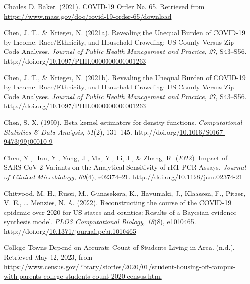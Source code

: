 \documentclass[12pt,twoside]{smiththesis}
\newlength{\cslhangindent}
\newenvironment{CSLReferences}[2] %
 {%
\setlength{\parindent}{0pt}
\ifodd #1 \everypar{\setlength{\hangindent}{\cslhangindent}}\ignorespaces\fi
\ifnum #2 > 0
\setlength{\parskip}{#2\baselineskip}
  \fi
}%
{}
\begin{document}
\begin{CSLReferences}{1}{0}
\leavevmode{}%
Charles D. Baker. (2021). {COVID-19 Order No}. 65. Retrieved from \url{https://www.mass.gov/doc/covid-19-order-65/download}

\leavevmode{}%
Chen, J. T., \& Krieger, N. (2021a). Revealing the {Unequal Burden} of {COVID-19} by {Income}, {Race}/{Ethnicity}, and {Household Crowding}: {US County Versus Zip Code Analyses}. \emph{Journal of Public Health Management and Practice}, \emph{27}, S43--S56. http://doi.org/\href{https://doi.org/10.1097/PHH.0000000000001263}{10.1097/PHH.0000000000001263}

\leavevmode{}%
Chen, J. T., \& Krieger, N. (2021b). Revealing the {Unequal Burden} of {COVID-19} by {Income}, {Race}/{Ethnicity}, and {Household Crowding}: {US County Versus Zip Code Analyses}. \emph{Journal of Public Health Management and Practice}, \emph{27}, S43--S56. http://doi.org/\href{https://doi.org/10.1097/PHH.0000000000001263}{10.1097/PHH.0000000000001263}

\leavevmode{}%
Chen, S. X. (1999). Beta kernel estimators for density functions. \emph{Computational Statistics \& Data Analysis}, \emph{31}(2), 131--145. http://doi.org/\href{https://doi.org/10.1016/S0167-9473(99)00010-9}{10.1016/S0167-9473(99)00010-9}

\leavevmode{}%
Chen, Y., Han, Y., Yang, J., Ma, Y., Li, J., \& Zhang, R. (2022). Impact of {SARS-CoV-2 Variants} on the {Analytical Sensitivity} of {rRT-PCR Assays}. \emph{Journal of Clinical Microbiology}, \emph{60}(4), e02374--21. http://doi.org/\href{https://doi.org/10.1128/jcm.02374-21}{10.1128/jcm.02374-21}

\leavevmode{}%
Chitwood, M. H., Russi, M., Gunasekera, K., Havumaki, J., Klaassen, F., Pitzer, V. E., \ldots{} Menzies, N. A. (2022). Reconstructing the course of the {COVID-19} epidemic over 2020 for {US} states and counties: {Results} of a {Bayesian} evidence synthesis model. \emph{PLOS Computational Biology}, \emph{18}(8), e1010465. http://doi.org/\href{https://doi.org/10.1371/journal.pcbi.1010465}{10.1371/journal.pcbi.1010465}

\leavevmode{}%
College {Towns Depend} on {Accurate Count} of {Students Living} in {Area}. (n.d.). Retrieved May 12, 2023, from \url{https://www.census.gov/library/stories/2020/01/student-housing-off-campus-with-parents-college-students-count-2020-census.html}


\end{CSLReferences}
\end{document}
